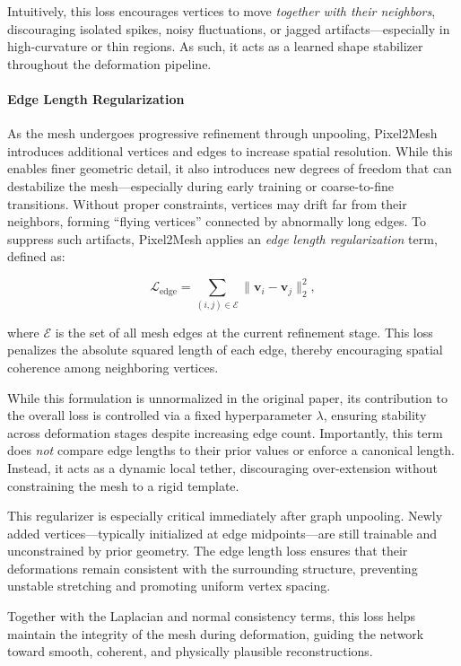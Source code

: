 Intuitively, this loss encourages vertices to move \emph{together with their neighbors}, discouraging isolated spikes, noisy fluctuations, or jagged artifacts—especially in high-curvature or thin regions. As such, it acts as a learned shape stabilizer throughout the deformation pipeline.

\paragraph{Edge Length Regularization}

As the mesh undergoes progressive refinement through unpooling, Pixel2Mesh introduces additional vertices and edges to increase spatial resolution. While this enables finer geometric detail, it also introduces new degrees of freedom that can destabilize the mesh—especially during early training or coarse-to-fine transitions. Without proper constraints, vertices may drift far from their neighbors, forming ``flying vertices'' connected by abnormally long edges. To suppress such artifacts, Pixel2Mesh applies an \emph{edge length regularization} term, defined as:

\[
\mathcal{L}_{\text{edge}} = \sum_{(i,j) \in \mathcal{E}} \| \mathbf{v}_i - \mathbf{v}_j \|_2^2,
\]

where \( \mathcal{E} \) is the set of all mesh edges at the current refinement stage. This loss penalizes the absolute squared length of each edge, thereby encouraging spatial coherence among neighboring vertices.

While this formulation is unnormalized in the original paper, its contribution to the overall loss is controlled via a fixed hyperparameter \( \lambda \), ensuring stability across deformation stages despite increasing edge count. Importantly, this term does \emph{not} compare edge lengths to their prior values or enforce a canonical length. Instead, it acts as a dynamic local tether, discouraging over-extension without constraining the mesh to a rigid template.

This regularizer is especially critical immediately after graph unpooling. Newly added vertices—typically initialized at edge midpoints—are still trainable and unconstrained by prior geometry. The edge length loss ensures that their deformations remain consistent with the surrounding structure, preventing unstable stretching and promoting uniform vertex spacing.

Together with the Laplacian and normal consistency terms, this loss helps maintain the integrity of the mesh during deformation, guiding the network toward smooth, coherent, and physically plausible reconstructions.

